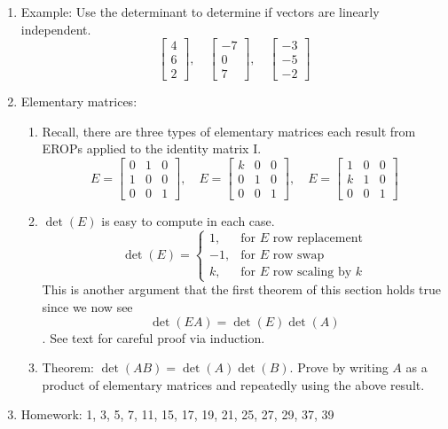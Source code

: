 \documentclass{article}
\begin{document}
\begin{enumerate}
\item Example: Use the determinant to determine if vectors are linearly independent.
\[
\left[
\begin{array}{c}
4 \\ 6 \\ 2 
\end{array}
\right], \quad
\left[
\begin{array}{c}
-7 \\ 0 \\ 7 
\end{array}
\right], \quad
\left[
\begin{array}{c}
-3 \\ -5 \\ -2
\end{array}
\right]
\]

\item Elementary matrices:
\begin{enumerate}
\item Recall, there are three types of elementary matrices each result from EROPs applied to the identity matrix I.
\[
E = \left[
\begin{array}{ccc}
0 & 1 & 0 \\
1 & 0 & 0  \\
0 & 0 & 1
\end{array}
\right], \quad
E = \left[
\begin{array}{ccc}
k & 0 & 0 \\
0 & 1 & 0  \\
0 & 0 & 1
\end{array}
\right], \quad
E = \left[
\begin{array}{ccc}
1 & 0 & 0 \\
k & 1 & 0  \\
0 & 0 & 1
\end{array}
\right]
\]

\item $\det(E)$ is easy to compute in each case.
\[
\det(E) = \begin{cases}
1, & \text{for $E$ row replacement} \\
-1, & \text{for $E$ row swap} \\
k, & \text{for $E$ row scaling by $k$}
\end{cases}
\]
This is another argument that the first theorem of this section holds true since we now see
\[
\det(EA) = \det(E)\det(A)
\]. See text for careful proof via induction.

\item Theorem: $\det(AB) = \det(A)\det(B)$. Prove by writing $A$ as a product of elementary matrices and repeatedly using the above result.
\end{enumerate}

\item Homework: 1, 3, 5, 7, 11, 15, 17, 19, 21, 25, 27, 29, 37, 39

\end{enumerate}
\end{document}
